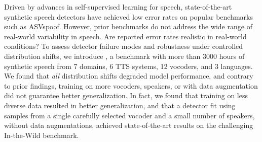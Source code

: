 Driven by advances in self-supervised learning for speech, state-of-the-art synthetic speech detectors have achieved low error rates on popular benchmarks such as ASVspoof. However, prior benchmarks do not address the wide range of real-world variability in speech. Are reported error rates realistic in real-world conditions? To assess detector failure modes and robustness under controlled distribution shifts, we introduce \methodName, a benchmark with more than 3000 hours of synthetic speech from 7 domains, 6 TTS systems, 12 vocoders, and 3 languages. We found that \emph{all} distribution shifts degraded model performance, and contrary to prior findings, training on more vocoders, speakers, or with data augmentation did not guarantee better generalization. In fact, we found that training on less diverse data resulted in better generalization, and that a detector fit using samples from a single carefully selected vocoder and a small number of speakers, without data augmentations, achieved state-of-the-art results on the challenging In-the-Wild benchmark.
